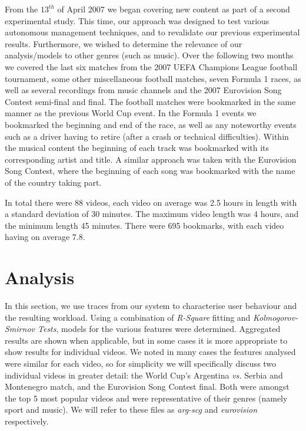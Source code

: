 \documentclass[a4paper,11pt]{article}
\begin{document}
From the $13^{th}$ of April 2007 we began covering new content as part of a second experimental study. This time, our approach was designed to test various autonomous management techniques, and to revalidate our previous experimental results. Furthermore, we wished to determine the relevance of our analysis/models to other genres (such as music). Over the following two months we covered the last six matches from the 2007 UEFA Champions League football tournament, some other miscellaneous football matches, seven Formula 1 races, as well as several recordings from music channels and the 2007 Eurovision Song Contest semi-final and final. The football matches were bookmarked in the same manner as the previous World Cup event. In the Formula 1 events we bookmarked the beginning and end of the race, as well as any noteworthy events such as a driver having to retire (after a crash or technical difficulties). Within the musical content the beginning of each track was bookmarked with its corresponding artist and title. A similar approach was taken with the Eurovision Song Contest, where the beginning of each song was bookmarked with the name of the country taking part.


In total there were 88 videos, each video on average was 2.5 hours in length with a standard deviation of 30 minutes. The maximum video length was 4 hours, and the minimum length 45 minutes. There were 695 bookmarks, with each video having on average 7.8.

\section{Analysis}
\label{sect:results}

In this section, we use traces from our system to characterise user behaviour and the resulting workload. Using a combination of {\em R-Square} fitting and {\em Kolmogorov-Smirnov Tests}, models for the various features were determined. Aggregated results are shown when applicable, but in some cases it is more appropriate to show results for individual videos. We noted in many cases the features analysed were similar for each video, so for simplicity we will specifically discuss two individual videos in greater detail: the World Cup's Argentina \emph{vs.} Serbia and Montenegro match, and the Eurovision Song Contest final. Both were amongst the top 5 most popular videos and were representative of their genres (namely sport and music). We will refer to these files as \emph{arg-scg} and \emph{eurovision} respectively.
\end{document}
